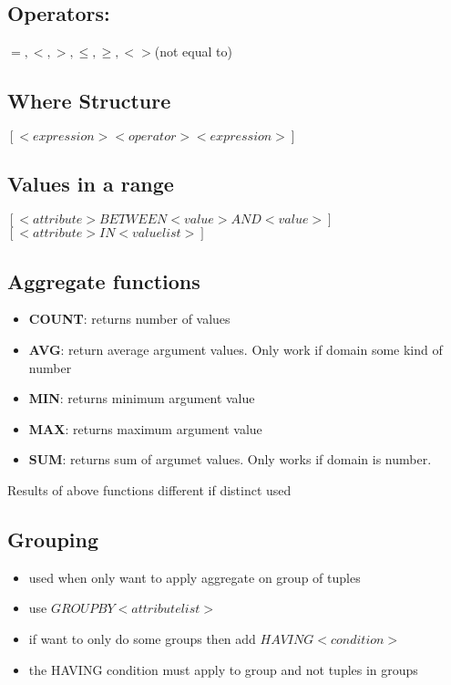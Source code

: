 \documentclass{article}
\newcommand\tab[1][0.5cm]{\hspace*{#1}}
\begin{document}
	\subsection{Operators:}
		\tab$=, <, >, \leq, \geq, <>$(not equal to)

	\subsection{Where Structure}
		\tab$[<expression> <operator> <expression>]$

	\subsection{Values in a range}
		\tab$[<attribute> BETWEEN <value> AND <value>]$
		\\\tab$[<attribute> IN <value list>]$

	\subsection{Aggregate functions}
		\begin{itemize}
			\item \textbf{COUNT}: returns number of values
			\item \textbf{AVG}: return average argument values. Only work if domain some kind of number
			\item \textbf{MIN}: returns minimum argument value
			\item \textbf{MAX}: returns maximum argument value
			\item \textbf{SUM}: returns sum of argumet values. Only works if domain is number.
		\end{itemize}

		Results of above functions different if distinct used

	\subsection{Grouping}
		\begin{itemize}
			\item used when only want to apply aggregate on group of tuples
			\item use $GROUP BY <attribute list>$
			\item if want to only do some groups then add  $HAVING <condition>$
			\item the HAVING condition must apply to group and not tuples in groups
		\end{itemize}
\end{document}
